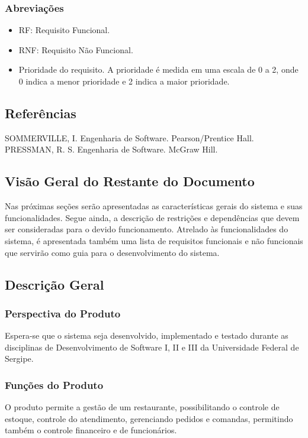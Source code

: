 	\subsubsection{Abreviações}
	\begin{itemize}
	\item[] RF: Requisito Funcional.
	\item[] RNF: Requisito Não Funcional.
	\item[] Prioridade do requisito. A prioridade é medida em uma escala de 0 a 2, onde 0 indica a menor prioridade e 2 indica a maior prioridade.
	\end{itemize}



\subsection{Referências}
SOMMERVILLE, I. Engenharia de Software. Pearson/Prentice Hall.
PRESSMAN, R. S. Engenharia de Software. McGraw Hill.



\subsection{Visão Geral do Restante do Documento}
Nas próximas seções serão apresentadas as características gerais do sistema e suas funcionalidades. Segue ainda, a descrição de restrições e dependências que devem ser consideradas para o devido funcionamento. Atrelado às funcionalidades do sistema, é apresentada também uma lista de requisitos funcionais e não funcionais que servirão como guia para o desenvolvimento do sistema.



\subsection{Descrição Geral}

	\subsubsection{Perspectiva do Produto}
	Espera-se que o sistema seja desenvolvido, implementado e testado durante as disciplinas de Desenvolvimento de Software I, II e III da Universidade Federal de Sergipe.
	
	\subsubsection{Funções do Produto}
	O produto permite a gestão de um restaurante, possibilitando o controle de estoque, controle do atendimento, gerenciando pedidos e comandas, permitindo também o controle financeiro e de funcionários.
	
